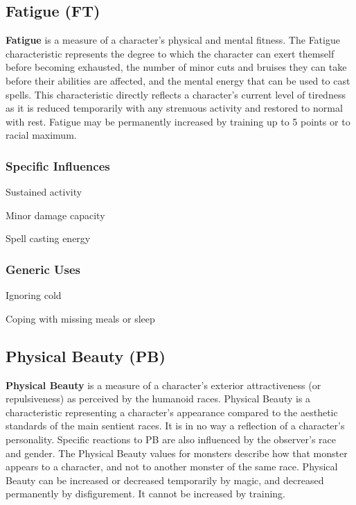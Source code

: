 \begin{multicols*}{3}
\subsection{Fatigue (FT)}

\textbf{Fatigue} is a measure of a character's physical and mental
fitness.  The Fatigue characteristic represents the degree to which
the character can exert themself before becoming exhausted, the number
of minor cuts and bruises they can take before their abilities are
affected, and the mental energy that can be used to cast spells. This
characteristic directly reflects a character's current level of
tiredness as it is reduced temporarily with any strenuous activity and
restored to normal with rest.  Fatigue may be permanently increased by
training up to 5 points or to racial maximum.

\subsubsection{Specific Influences}
\begin{Itemize}
\item Sustained activity
\item Minor damage capacity
\item Spell casting energy
\end{Itemize}
\subsubsection{Generic Uses}
\begin{Itemize}
\item Ignoring cold
\item Coping with missing meals or sleep
\end{Itemize}

\subsection{Physical Beauty (PB)}

\textbf{Physical Beauty} is a measure of a character's exterior
attractiveness (or repulsiveness) as perceived by the humanoid races.
Physical Beauty is a characteristic representing a character's
appearance compared to the aesthetic standards of the main sentient
races.  It is in no way a reflection of a character's personality.
Specific reactions to PB are also influenced by the observer's race
and gender.  The Physical Beauty values for monsters describe how that
monster appears to a character, and not to another monster of the same
race.  Physical Beauty can be increased or decreased temporarily by
magic, and decreased permanently by disfigurement. It cannot be
increased by training.

\end{multicols*}
